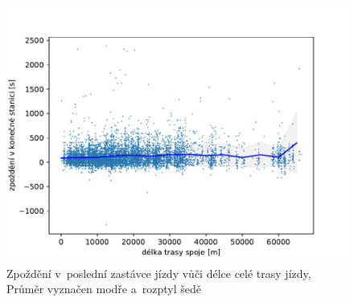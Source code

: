 \begin{figure}
   \centering
 \includegraphics[width=1\linewidth]{../img/trips_total_delay}
 \caption{Zpoždění v~poslední zastávce jízdy vůči délce celé trasy jízdy, Průměr vyznačen modře a~rozptyl šedě}
 \label{fig:trips_total_delay}
\end{figure}
